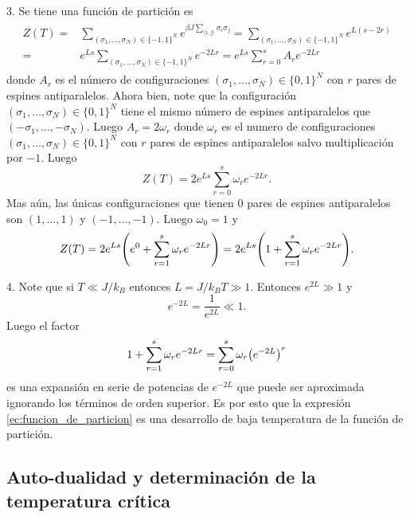 \documentclass{article}
\begin{document}
3. Se tiene una función de partición es
\begin{align}
\begin{split}
Z(T)=&\sum_{(\sigma_1,\dots,\sigma_N)\in\{-1,1\}^N}e^{\beta J\sum\limits_{\langle i,j\rangle}\sigma_i\sigma_j}=\sum_{(\sigma_1,\dots,\sigma_N)\in\{-1,1\}^N}e^{L(s-2r)}\\
=&e^{Ls}\sum_{(\sigma_1,\dots,\sigma_N)\in\{-1,1\}^N}e^{-2Lr}=e^{Ls}\sum_{r=0}^s A_re^{-2Lr}
\end{split}
\end{align}
donde $A_r$ es el número de configuraciones $(\sigma_1,\dots,\sigma_N)\in\{0,1\}^N$ con $r$ pares de espines antiparalelos. Ahora bien, note que la configuración $(\sigma_1,\dots,\sigma_N)\in\{0,1\}^N$ tiene el mismo número de espines antiparalelos que $(-\sigma_1,\dots,-\sigma_N)$. Luego $A_r=2\omega_r$ donde $\omega_r$ es el numero de configuraciones $(\sigma_1,\dots,\sigma_N)\in\{0,1\}^N$ con $r$ pares de espines antiparalelos salvo multiplicación por $-1$. Luego
\begin{equation}
Z(T)=2e^{Ls}\sum_{r=0}^s\omega_re^{-2Lr}.
\end{equation}
Mas aún, las únicas configuraciones que tienen $0$ pares de espines antiparalelos son $(1,\dots,1)$ y $(-1,\dots,-1)$. Luego $\omega_0=1$ y 
\begin{equation}\label{ec:funcion_de_particion}
Z(T)=2e^{Ls}\qty(e^0+\sum_{r=1}^s\omega_re^{-2Lr})=2e^{Ls}\qty(1+\sum_{r=1}^s\omega_re^{-2Lr}).
\end{equation}

4. Note que si $T\ll J/k_B$ entonces $L=J/k_B T\gg 1$. Entonces $e^{2L}\gg 1$ y 
\begin{equation}
e^{-2L}=\frac{1}{e^{2L}}\ll 1.
\end{equation}
Luego el factor
\begin{equation}
1+\sum_{r=1}^s\omega_re^{-2Lr}=\sum_{r=0}^s\omega_r\qty(e^{-2L})^r
\end{equation}
es una expansión en serie de potencias de $e^{-2L}$ que puede ser aproximada ignorando los términos de orden superior. Es por esto que la expresión \eqref{ec:funcion_de_particion} es una desarrollo de baja temperatura de la función de partición. 

\subsection{Auto-dualidad y determinación de la temperatura crítica}
\end{document}
